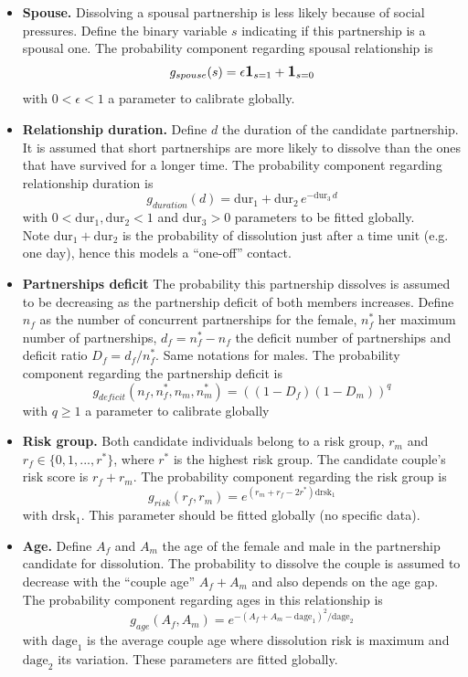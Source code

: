 \documentclass[11pt, onecolumn]{article}
\newcommand{\one}[1]{\textbf{\large{1}}_{#1}}
\begin{document}
\begin{itemize}
\item \textbf{Spouse.}
Dissolving a spousal partnership is less likely because of social pressures. Define the binary variable $s$ indicating if this partnership is a spousal one. The probability component regarding spousal relationship is
$$g_{spouse}(s) = \epsilon \one{s=1}+ \one{s=0} $$
with $0<\epsilon<1$ a parameter to calibrate globally.


\item \textbf{Relationship duration.}
Define $d$ the duration of the candidate partnership. It is assumed that short partnerships are more likely to dissolve than the ones that have survived for a longer time. 
The probability component regarding relationship duration is
$$g_{duration}(d) =\mathrm{dur}_1 + \mathrm{dur}_2 \, e^{-\mathrm{dur}_3\, d}$$
with $0<\mathrm{dur}_1,\mathrm{dur}_2<1$ and $\mathrm{dur}_3>0$ parameters to be fitted globally.\\
Note $\mathrm{dur}_1+\mathrm{dur}_2$ is the probability of dissolution just after a time unit (e.g. one day), hence this models a ``one-off'' contact.  

\item \textbf{Partnerships deficit}
The probability this partnership dissolves is assumed to be decreasing as the partnership deficit of both members increases. Define $n_f$ as the number of concurrent partnerships for the female, $n^*_f$ her maximum number of partnerships, $d_f=n^*_f-n_f$ the deficit number of partnerships and deficit ratio $D_f=d_f/n^*_f$. Same notations for males. The probability component regarding the partnership deficit is
$$g_{deficit}(n_f,n^*_f,n_m,n^*_m) = ((1-D_f)(1- D_m))^q$$
with $q\geq 1$ a parameter to calibrate globally

\item \textbf{Risk group.}
Both candidate individuals belong to a risk group, $r_m$ and $r_f\in \{0,1,...,r^*\}$, where $r^*$ is the highest risk group. The candidate couple's risk score is $r_f+r_m$. The probability component regarding the risk group is
$$g_{risk}(r_f,r_m) = e^{(r_m+r_f-2r^*)\mathrm{drsk}_1}  $$
with $\mathrm{drsk}_1$. This parameter should be fitted globally (no specific data).


\item \textbf{Age.} 
Define $A_f$ and $A_m$ the age of the female and male in the partnership candidate for dissolution. The probability to dissolve the couple is assumed to decrease with the ``couple age'' $A_f+A_m$ and also depends on the age gap.
The probability component regarding ages in this relationship is
$$g_{age}(A_f,A_m) =e^{-(A_f+A_m-\mathrm{dage}_1)^2/\mathrm{dage}_2 }$$
with $\mathrm{dage}_1$ is the average couple age where dissolution risk is maximum and $\mathrm{dage}_2$ its variation. These parameters are fitted globally. 


\end{itemize}
\end{document}
